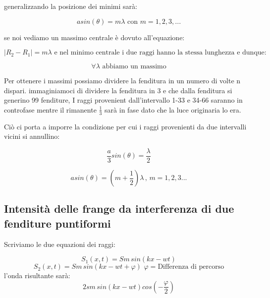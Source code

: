\documentclass[a4paper,11pt]{article}
\begin{document}
generalizzando la posizione dei minimi sarà:

\begin{center}
    \[
    a sin(\theta) = m \lambda \, \, \text{con} \, \, m = 1, 2, 3, ...
    \]
\end{center}



\pagebreak

se noi vediamo un massimo centrale è dovuto all'equazione:


\begin{center}
    \[
    \vert R_2 - R_1 \vert = m \lambda \, \, \text{e nel minimo centrale i due raggi hanno la stessa lunghezza e dunque:}
    \]
\end{center}
\begin{center}
    \[
            \forall \lambda \, \, \text{abbiamo un massimo}
    \]

\end{center}


Per ottenere i massimi possiamo dividere la fenditura in un numero di volte n dispari. immaginiamoci di dividere la fenditura in 3 e che dalla fenditura si generino 99 fenditure, I raggi provenient dall'intervallo 1-33 e 34-66 saranno in controfase mentre il rimanente \( \frac{1}{3}  \) sarà in fase dato che la luce originaria lo era.

Ciò ci porta a imporre la condizione per cui i raggi provenienti da due intervalli vicini si annullino:

\begin{center}
    \[
    \frac{a}{3} sin(\theta) = \frac{\lambda}{2}   
    \]
\end{center}

\begin{center}
    \[
    a sin(\theta) = (m + \frac{1}{2}) \lambda \, , \, m = 1,2,3...  
    \]
\end{center}




\subsection{Intensità delle frange da interferenza di due fenditure puntiformi }


Scriviamo le due equazioni dei raggi:

\[
S_1(x,t) = Sm \,sin(kx-wt) 
\]
\[
S_2(x,t) = Sm \,sin(kx-wt + \varphi) \, \, \varphi = \text{Differenza di percorso}
\]
l'onda risultante sarà:
\[
2 sm \, sin(kx-wt) cos(- \frac{\varphi}{2})    
\]
\end{document}
